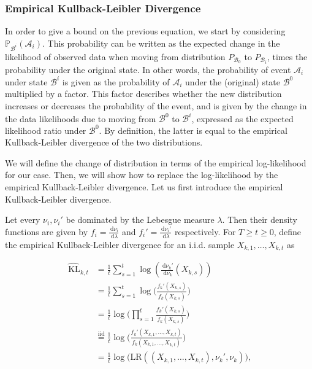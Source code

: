 \documentclass[11pt,]{article}
\newcommand{\KL}{\,\text{KL}}
\newcommand{\der}{\,\text{d}}
\begin{document}
\subsubsection{Empirical Kullback-Leibler
Divergence}\label{empirical-kullback-leibler-divergence}

In order to give a bound on the previous equation, we start by
considering \(\mathbb{P}_{\mathcal{B}^i}(\mathcal{A}_i)\). This
probability can be written as the expected change in the likelihood of
observed data when moving from distribution \(P_{\mathcal{B}_0}\) to
\(P_{\mathcal{B}_i}\), times the probability under the original state.
In other words, the probability of event \(\mathcal{A}_i\) under state
\(\mathcal{B}^i\) is given as the probability of \(\mathcal{A}_i\) under
the (original) state \(\mathcal{B}^0\) multiplied by a factor. This
factor describes whether the new distribution increases or decreases the
probability of the event, and is given by the change in the data
likelihoods due to moving from \(\mathcal{B}^0\) to \(\mathcal{B}^i\),
expressed as the expected likelihood ratio under \(\mathcal{B}^0\). By
definition, the latter is equal to the empirical Kullback-Leibler
divergence of the two distributions.

We will define the change of distribution in terms of the empirical
log-likelihood for our case. Then, we will show how to replace the
log-likelihood by the empirical Kullback-Leibler divergence. Let us
first introduce the empirical Kullback-Leibler divergence.

Let every \(\nu_i, \nu_i'\) be dominated by the Lebesgue measure
\(\lambda\). Then their density functions are given by
\(f_i = \frac{\der \nu_i}{\der \lambda}\) and
\(f_i' = \frac{\der \nu_i'}{\der \lambda}\) respectively. For
\(T \geq t \geq 0\), define the empirical Kullback-Leibler divergence
for an i.i.d. sample \(X_{k,1}, \dots,X_{k,t}\) as

\begin{align*}
\hat{\KL}_{k,t} & = \frac{1}{t} \sum_{s=1}^{t} \log(\frac{\der \nu_k'}{\der \nu_k}(X_{k,s})) \\
& = \frac{1}{t} \sum_{s=1}^{t} \log \big(\frac{f_k'(X_{k,s})}{f_k(X_{k,s})} \big) \\
& = \frac{1}{t} \log \big( \prod_{s=1}^{t} \frac{f_k'(X_{k,s})}{f_k(X_{k,s})} \big) \\
& \stackrel{\text{iid}}{=} \frac{1}{t} \log \big( \frac{f_k'(X_{k,1}, \dots,X_{k,t})}{f_k(X_{k,1}, \dots,X_{k,t})} \big) \\
& = \frac{1}{t} \log \big( \text{LR}((X_{k,1}, \dots,X_{k,t}), \nu_k', \nu_k) \big),
\end{align*}
\end{document}
